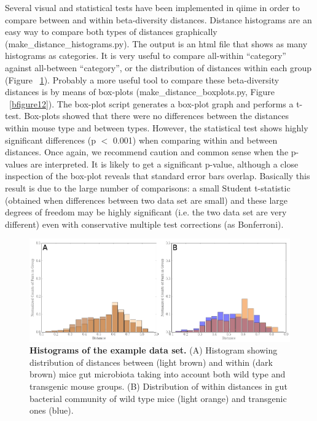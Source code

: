 Several visual and statistical tests have been implemented in \gls{qiime} in order to compare
between and within beta-diversity distances. Distance histograms are an easy way to
compare both types of distances graphically (make\_distance\_histograms.py). The output
is an html file that shows as many histograms as categories. It is very useful to compare
all-within “category” against all-between “category”, or the distribution of distances
within each group (Figure ~\ref{bfigure11}). Probably a more useful tool to compare these
beta-diversity distances is by means of box-plots (make\_distance\_boxplots.py, Figure ~\ref{bfigure12}).
The box-plot script generates a box-plot graph and performs a t-test. Box-plots showed that
there were no differences between the distances within mouse type and between types.
However, the statistical test shows highly significant differences (p $<$ 0.001) when comparing
within and between distances. Once again, we recommend caution and common sense when the
p-values are interpreted. It is likely to get a significant p-value, although a close
inspection of the box-plot reveals that standard error bars overlap. Basically this
result is due to the large number of comparisons: a small Student t-statistic
(obtained when differences between two data set are small) and these large degrees
of freedom may be highly significant (i.e. the two data set are very different) even
with conservative multiple test corrections (as Bonferroni).

\begin{figure}[htbp]
\includegraphics[width=\columnwidth]{chapter_book_figures/Figure_11.jpg}
\caption[Histograms of the example data set]{\textbf{Histograms of the example data set.}
(A) Histogram showing distribution of distances between (light brown) and within
(dark brown) mice gut microbiota taking into account both wild type and transgenic
mouse groups. (B) Distribution of within distances in gut bacterial community of wild
type mice (light orange) and transgenic ones (blue).}
\label{bfigure11}
\end{figure}

